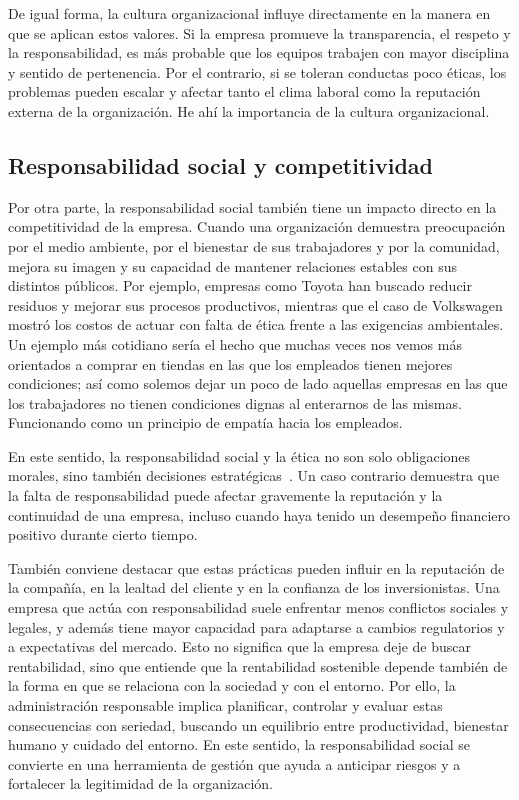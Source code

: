 De igual forma, la cultura organizacional influye directamente en la manera en que se aplican estos valores. Si la empresa promueve la transparencia, el respeto y la responsabilidad, es más probable que los equipos trabajen con mayor disciplina y sentido de pertenencia. Por el contrario, si se toleran conductas poco éticas, los problemas pueden escalar y afectar tanto el clima laboral como la reputación externa de la organización. He ahí la importancia de la cultura organizacional.

\subsection*{Responsabilidad social y competitividad}

Por otra parte, la responsabilidad social también tiene un impacto directo en la competitividad de la empresa. Cuando una organización demuestra preocupación por el medio ambiente, por el bienestar de sus trabajadores y por la comunidad, mejora su imagen y su capacidad de mantener relaciones estables con sus distintos públicos. Por ejemplo, empresas como Toyota han buscado reducir residuos y mejorar sus procesos productivos, mientras que el caso de Volkswagen mostró los costos de actuar con falta de ética frente a las exigencias ambientales. Un ejemplo más cotidiano sería el hecho que muchas veces nos vemos más orientados a comprar en tiendas en las que los empleados tienen mejores condiciones; así como solemos dejar un poco de lado aquellas empresas en las que los trabajadores no tienen condiciones dignas al enterarnos de las mismas. Funcionando como un principio de empatía hacia los empleados.

En este sentido, la responsabilidad social y la ética no son solo obligaciones morales, sino también decisiones estratégicas~\parencite{carroll1991,ungc}. Un caso contrario demuestra que la falta de responsabilidad puede afectar gravemente la reputación y la continuidad de una empresa, incluso cuando haya tenido un desempeño financiero positivo durante cierto tiempo.

También conviene destacar que estas prácticas pueden influir en la reputación de la compañía, en la lealtad del cliente y en la confianza de los inversionistas. Una empresa que actúa con responsabilidad suele enfrentar menos conflictos sociales y legales, y además tiene mayor capacidad para adaptarse a cambios regulatorios y a expectativas del mercado. Esto no significa que la empresa deje de buscar rentabilidad, sino que entiende que la rentabilidad sostenible depende también de la forma en que se relaciona con la sociedad y con el entorno. Por ello, la administración responsable implica planificar, controlar y evaluar estas consecuencias con seriedad, buscando un equilibrio entre productividad, bienestar humano y cuidado del entorno. En este sentido, la responsabilidad social se convierte en una herramienta de gestión que ayuda a anticipar riesgos y a fortalecer la legitimidad de la organización.
